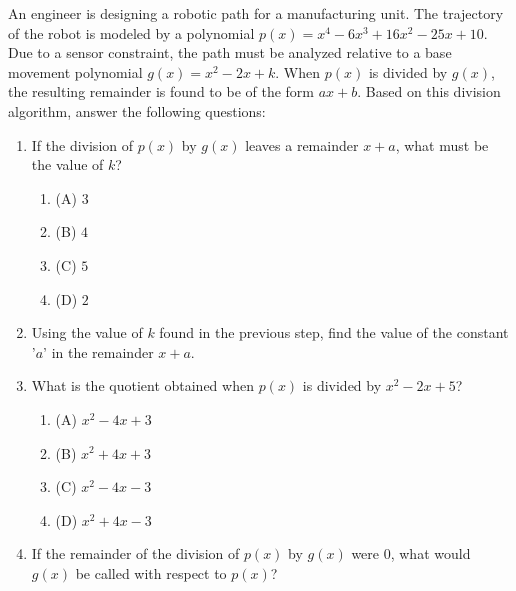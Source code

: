 \documentclass[12pt,a4paper]{exam}
\begin{document}
\begin{questions}
\question[4] An engineer is designing a robotic path for a manufacturing unit. The trajectory of the robot is modeled by a polynomial $p(x) = x^4 - 6x^3 + 16x^2 - 25x + 10$. Due to a sensor constraint, the path must be analyzed relative to a base movement polynomial $g(x) = x^2 - 2x + k$. When $p(x)$ is divided by $g(x)$, the resulting remainder is found to be of the form $ax + b$. Based on this division algorithm, answer the following questions:
\vspace{0.2cm}
\begin{enumerate}[label=(\roman*)]
  \item If the division of $p(x)$ by $g(x)$ leaves a remainder $x + a$, what must be the value of $k$?
  \begin{enumerate}[label=(\Alph*)]
    \item (A) $3$
    \item (B) $4$
    \item (C) $5$
    \item (D) $2$
  \end{enumerate}
  \item Using the value of $k$ found in the previous step, find the value of the constant '$a$' in the remainder $x + a$.
  \item What is the quotient obtained when $p(x)$ is divided by $x^2 - 2x + 5$?
  \begin{enumerate}[label=(\Alph*)]
    \item (A) $x^2 - 4x + 3$
    \item (B) $x^2 + 4x + 3$
    \item (C) $x^2 - 4x - 3$
    \item (D) $x^2 + 4x - 3$
  \end{enumerate}
  \item If the remainder of the division of $p(x)$ by $g(x)$ were $0$, what would $g(x)$ be called with respect to $p(x)$?
\end{enumerate}
\vspace{0.15cm}


\end{questions}
\end{document}
